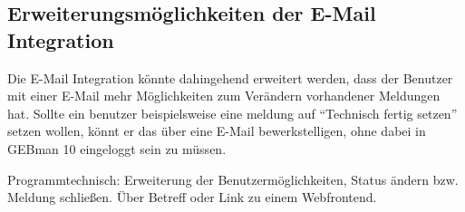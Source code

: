 \subsection{Erweiterungsmöglichkeiten der E-Mail Integration}
\noindent
Die E-Mail Integration könnte dahingehend erweitert werden, dass der Benutzer mit einer E-Mail mehr Möglichkeiten zum Verändern vorhandener Meldungen hat. Sollte ein benutzer beispielsweise eine meldung auf \enquote{Technisch fertig setzen} setzen wollen, könnt er das über eine E-Mail bewerkstelligen, ohne dabei in GEBman 10 eingeloggt sein zu müssen.


Programmtechnisch:
Erweiterung der Benutzermöglichkeiten, Status ändern bzw. Meldung schließen. Über Betreff oder Link zu einem Webfrontend.


